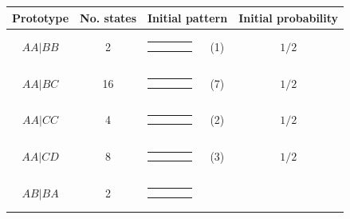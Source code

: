 \documentclass[9pt,letterpaper,twoside]{article}
\begin{document}
{
\begin{center}
\begin{tabular}{ccrlc} \hline
Prototype & No. states & \multicolumn{2}{c}{Initial pattern} & Initial probability \\ \hline
$AA|BB$ & 2 & 
{\renewcommand{\arraystretch}{0.3}
\renewcommand{\tabcolsep}{0.5mm}
\parbox[b][3mm][c]{12mm}{
\begin{tabular}{|p{2mm}|p{2mm}||p{2mm}|p{2mm}|} \hline
$\bullet$ & $\circ  $ &           &           \\
$\bullet$ & $\circ  $ &           &           \\ \hline
\end{tabular}}}
& (1) & $1/2$ \\
$AA|BC$ & 16 & 
{\renewcommand{\arraystretch}{0.3}
\renewcommand{\tabcolsep}{0.5mm}
\parbox[b][3mm][c]{12mm}{
\begin{tabular}{|p{2mm}|p{2mm}||p{2mm}|p{2mm}|} \hline
$\bullet$ & $\circ  $ &           &           \\
$\bullet$ &           & $\circ  $ &           \\ \hline
\end{tabular}}}
& (7) & $1/2$ \\
$AA|CC$ & 4 & 
{\renewcommand{\arraystretch}{0.3}
\renewcommand{\tabcolsep}{0.5mm}
\parbox[b][3mm][c]{12mm}{
\begin{tabular}{|p{2mm}|p{2mm}||p{2mm}|p{2mm}|} \hline
$\bullet$ &           & $\circ  $ &           \\
$\bullet$ &           & $\circ  $ &           \\ \hline
\end{tabular}}}
& (2) & $1/2$ \\
$AA|CD$ & 8 & 
{\renewcommand{\arraystretch}{0.3}
\renewcommand{\tabcolsep}{0.5mm}
\parbox[b][3mm][c]{12mm}{
\begin{tabular}{|p{2mm}|p{2mm}||p{2mm}|p{2mm}|} \hline
$\bullet$ &           & $\circ  $ &           \\
$\bullet$ &           &           & $\circ  $ \\ \hline
\end{tabular}}}
& (3) & $1/2$ \\
$AB|BA$ & 2 & 
{\renewcommand{\arraystretch}{0.3}
\renewcommand{\tabcolsep}{0.5mm}
\parbox[b][3mm][c]{12mm}{
\begin{tabular}{|p{2mm}|p{2mm}||p{2mm}|p{2mm}|} \hline
$\bullet$ & $\circ  $ &           &           \\
$\circ  $ & $\bullet$ &           &           \\ \hline

\end{tabular}}}
\end{tabular}
\end{center}}
\end{document}
